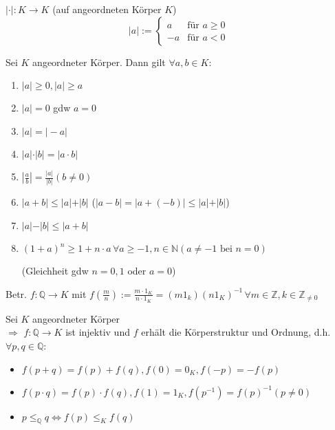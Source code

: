 \begin{definition}
	 $\vert\cdot\vert:K\rightarrow K$ (auf angeordneten Körper $K$) \[\vert a \vert:=\begin{cases}
	a&\text{für }a \ge 0 \\ -a& \text{für }a < 0\end{cases}\]
\end{definition}

\begin{proposition}
	Sei $K$ angeordneter Körper. Dann gilt $\forall a,b\in K$:
	\begin{enumerate}[label={\arabic*)}]
		\item $\vert a\vert\ge 0, \vert a\vert\ge a$
		\item $\vert a\vert = 0$ \gls{gdw} $a=0$
		\item $\vert a\vert = \vert -a\vert$
		\item $\vert a\vert\cdot\vert b\vert = \vert a\cdot b\vert$
		\item $\left\vert \frac{a}{b}\right\vert = \frac{\vert a\vert}{\vert b\vert} (b\neq 0)$
		\item {}
		
		$\vert a+b\vert \le \vert a\vert + \vert b\vert$ ($\vert a-b\vert = \vert a+(-b)\vert \le \vert a\vert + \vert b\vert$)
		\item $\left\vert a\vert - \vert b\right\vert \le \vert a+b\vert$
		\item {}
		
		$(1+a)^n \ge 1 + n\cdot a \,\forall a\ge -1, n\in\mathbb{N} (a\neq -1 \text{ bei }n = 0)$
		
		(Gleichheit \gls{gdw} $n=0,1$ oder $a=0$)
	\end{enumerate}
\end{proposition}
\begin{definition}
	Betr. $f:\mathbb{Q}\rightarrow K$ mit $f\left(\frac{m}{n}\right):= \frac{m\cdot 1_K}{n\cdot 1_K}=(m 1_k)(n 1_K)^{-1}\,\forall m\in\mathbb{Z},k\in\mathbb{Z}_{\neq 0}$
\end{definition}
\begin{proposition}
	Sei $K$ angeordneter Körper\\
	$\Rightarrow$ $f:\mathbb{Q}\rightarrow K$ ist injektiv und $f$ erhält die Körperstruktur und Ordnung, d.h. $\forall p,q\in\mathbb{Q}$:
	\begin{itemize}
		\item $f(p+q) = f(p) + f(q), f(0) = 0_K, f(-p) = -f(p)$
		\item $f(p\cdot q) = f(p)\cdot f(q), f(1) = 1_K, f(p^{-1}) = f(p)^{-1} (p\neq 0)$
		\item $p \le_\mathbb{Q} q \Leftrightarrow f(p) \le_K f(q)$
	\end{itemize}
\end{proposition}

